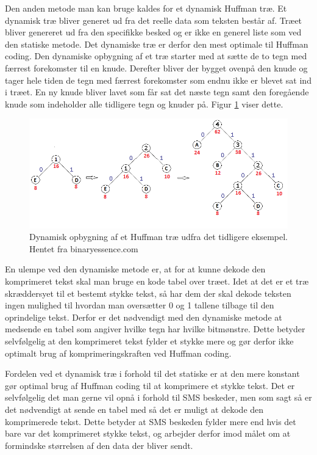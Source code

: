 Den anden metode man kan bruge kaldes for et dynamisk Huffman træ. Et dynamisk træ bliver generet ud fra det reelle data som teksten består af. Træet bliver genereret ud fra den specifikke besked og er ikke en generel liste som ved den statiske metode. Det dynamiske træ er derfor den mest optimale til Huffman coding. Den dynamiske opbygning af et træ starter med at sætte de to tegn med færrest forekomster til en knude. Derefter bliver der bygget ovenpå den knude og tager hele tiden de tegn med færrest forekomster som endnu ikke er blevet sat ind i træet. En ny knude bliver lavet som får sat det næste tegn samt den foregående knude som indeholder alle tidligere tegn og knuder på. Figur \ref{fig:dynamic_tree} viser dette.

\begin{figure}[H]
\centering
\includegraphics[width=\linewidth]{Billeder/dynamisk.png}
\caption{Dynamisk opbygning af et Huffman træ udfra det tidligere eksempel. Hentet fra binaryessence.com\cite{Hufftree_1}}
\label{fig:dynamic_tree}
\end{figure}

En ulempe ved den dynamiske metode er, at for at kunne dekode den komprimeret tekst skal man bruge en kode tabel over træet. Idet at det er et træ skræddersyet til et bestemt stykke tekst, så har dem der skal dekode teksten ingen mulighed til hvordan man oversætter 0 og 1 tallene tilbage til den oprindelige tekst. Derfor er det nødvendigt med den dynamiske metode at medsende en tabel som angiver hvilke tegn har hvilke bitmønstre. Dette betyder selvfølgelig at den komprimeret tekst fylder et stykke mere og gør derfor ikke optimalt brug af komprimeringskraften ved Huffman coding. \cite{Hufftree_4}

Fordelen ved et dynamisk træ i forhold til det statiske er at den mere konstant gør optimal brug af Huffman coding til at komprimere et stykke tekst. Det er selvfølgelig det man gerne vil opnå i forhold til SMS beskeder, men som sagt så er det nødvendigt at sende en tabel med så det er muligt at dekode den komprimerede tekst. Dette betyder at SMS beskeden fylder mere end hvis det bare var det komprimeret stykke tekst, og arbejder derfor imod målet om at formindske størrelsen af den data der bliver sendt.